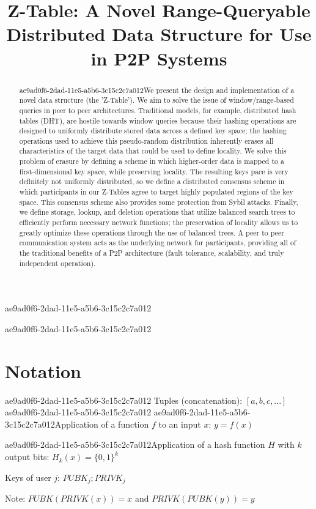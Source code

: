 \documentclass[12pt]{article}
\title{Z-Table: A Novel Range-Queryable Distributed Data Structure for Use in P2P Systems}
\begin{document}
ae9ad0f6-2dad-11e5-a5b6-3c15c2c7a012\maketitle

\begin{abstract}
ae9ad0f6-2dad-11e5-a5b6-3c15c2c7a012We present the design and implementation of a novel data structure (the 'Z-Table'). We aim to solve the issue of window/range-based queries in peer to peer architectures. Traditional models, for example,  distributed hash tables (DHT), are hostile towards window queries because their hashing operations are designed to uniformly distribute stored data across a defined key space; the hashing operations used to achieve this pseudo-random distribution inherently erases all characteristics of the target data that could be used to define locality. We solve this problem of erasure by defining a scheme in which higher-order data is mapped to a first-dimensional key space, while preserving locality. The resulting keys pace is very definitely not uniformly distributed, so we define a distributed consensus scheme in which participants in our Z-Tables agree to target highly populated regions of the key space. This consensus scheme also provides some protection from Sybil attacks. Finally, we define storage, lookup, and deletion operations that utilize balanced search trees to efficiently perform necessary network functions; the preservation of locality allows us to greatly optimize these operations through the use of balanced trees. A peer to peer communication system acts as the underlying network for participants, providing all of the traditional benefits of a P2P architecture (fault tolerance, scalability, and truly independent operation).
\end{abstract}
ae9ad0f6-2dad-11e5-a5b6-3c15c2c7a012
\section{Notation}
ae9ad0f6-2dad-11e5-a5b6-3c15c2c7a012
Tuples (concatenation): $[a,b,c,...]$
ae9ad0f6-2dad-11e5-a5b6-3c15c2c7a012
ae9ad0f6-2dad-11e5-a5b6-3c15c2c7a012Application of a function $f$ to an input $x$: $y=f(x)$

ae9ad0f6-2dad-11e5-a5b6-3c15c2c7a012Application of a hash function $H$ with $k$ output bits: $H_{k}(x) = \{0,1\}^k$

Keys of user $j$: $ PUBK_j; PRIVK_j $

Note: $PUBK(PRIVK(x)) = x$ and $PRIVK(PUBK(y)) = y$~
\end{document}
